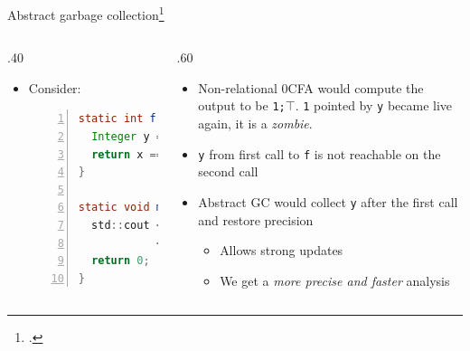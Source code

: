 \documentclass[aspectratio=169]{beamer}
\begin{document}
\begin{frame}[fragile]{Abstract garbage collection\footcite{might2006improving}}
  \small\vspace{-1em}
  \begin{columns}[t]
    \begin{column}{.40\textwidth}
        \begin{itemize}
        \item Consider:
          \begin{lstlisting}[language=Java,numbers=left]
static int f(int x) {
  Integer y = new Integer(x);
  return x == (int)y;
}

static void main(string[] args) {
  std::cout << f(1) << ';'
            << f(2) << endl;
  return 0;
}
          \end{lstlisting}
        \end{itemize}
    \end{column}
    \begin{column}{.60\textwidth}
      \pause
      \begin{itemize}[<+->]
      \item Non-relational 0CFA would compute the output to be \alert<2>{\texttt{1;$\top$}}. \texttt{1} pointed by \texttt{y} became live again, it is a \emph{zombie}.
      \item \texttt{y} from first call to \texttt{f} is not reachable on the second call
      \item Abstract GC would collect \texttt{y} after the first call and restore precision \pause
        \begin{itemize}[<+->] \footnotesize
        \item Allows strong updates
        \item We get a \alert{\emph{more precise and faster}} analysis
        \end{itemize}
      \end{itemize}
    \end{column}
  \end{columns}
\end{frame}

\end{document}
